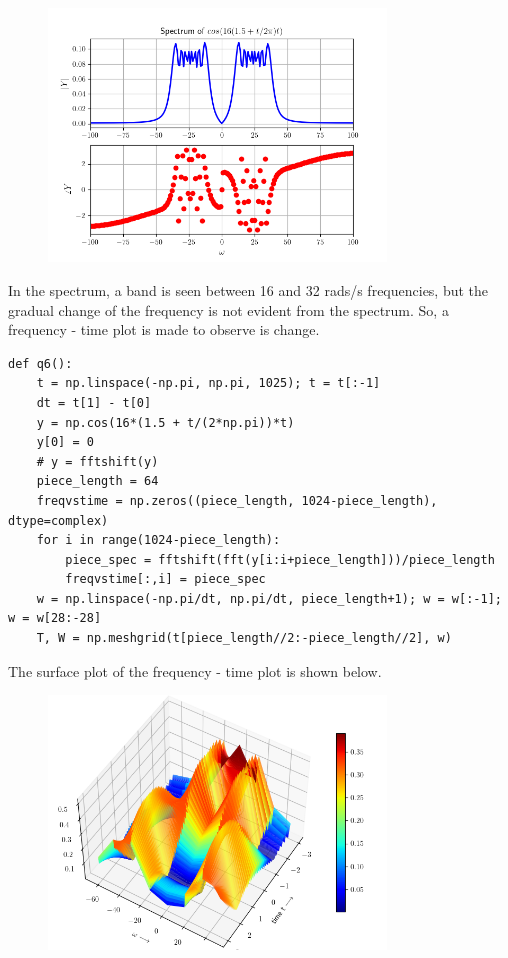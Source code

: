 \documentclass[12pt, a4paper]{article}
\begin{document}
\begin{figure}[H]
\centering
\includegraphics[width=0.8\textwidth]{q4_2.png}
\end{figure}

In the spectrum, a band is seen between 16 and 32 rads/s frequencies, but the gradual change of the frequency is not evident from the spectrum. So, a frequency - time plot is made to observe is change.

\begin{lstlisting}
def q6():
    t = np.linspace(-np.pi, np.pi, 1025); t = t[:-1]
    dt = t[1] - t[0]
    y = np.cos(16*(1.5 + t/(2*np.pi))*t)
    y[0] = 0
    # y = fftshift(y)
    piece_length = 64
    freqvstime = np.zeros((piece_length, 1024-piece_length), dtype=complex)
    for i in range(1024-piece_length):
        piece_spec = fftshift(fft(y[i:i+piece_length]))/piece_length
        freqvstime[:,i] = piece_spec
    w = np.linspace(-np.pi/dt, np.pi/dt, piece_length+1); w = w[:-1]; w = w[28:-28]
    T, W = np.meshgrid(t[piece_length//2:-piece_length//2], w)
\end{lstlisting}

The surface plot of the frequency - time plot is shown below. 

\begin{figure}[H]
\centering
\includegraphics[width=0.8\textwidth]{q6_1.png}
\end{figure}
\end{document}

